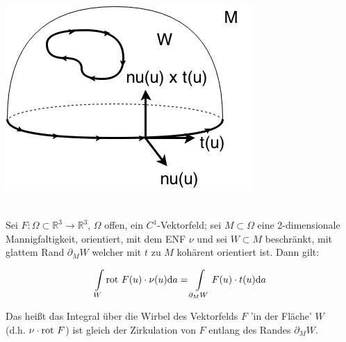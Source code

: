 \begin{definition}
\begin{center}
\includegraphics[scale=0.5]{pictures/009-02.png}
\end{center}

\end{definition}

\begin{satz}
\mbox{}\\
Sei $F: \Omega \subset \mathbb{R}^3 \rightarrow \mathbb{R}^3 $,
$\Omega$ offen, ein $C^1$-Vektorfeld;
sei $M \subset \Omega $ eine 2-dimensionale Mannigfaltigkeit, orientiert,
mit dem ENF $\nu$ und sei $W \subset M $ beschränkt,
mit glattem Rand $\partial_M W $ welcher mit $t$ zu $M$ kohärent orientiert ist. Dann gilt:

\begin{equation}
    \int\limits_W \mathrm{rot\ } F(u) \cdot \nu(u) \mathrm{d}a
    =
    \int\limits_{\partial_M W} F(u) \cdot t(u) \mathrm{d}a
\end{equation}

\end{satz}

Das heißt das Integral über die Wirbel des Vektorfelds $F$ 'in der Fläche' $W$\\
(d.h.  $\nu \cdot \mathrm{rot\ } F $)
ist gleich der Zirkulation von $F$ entlang des Randes $\partial_M W $.

